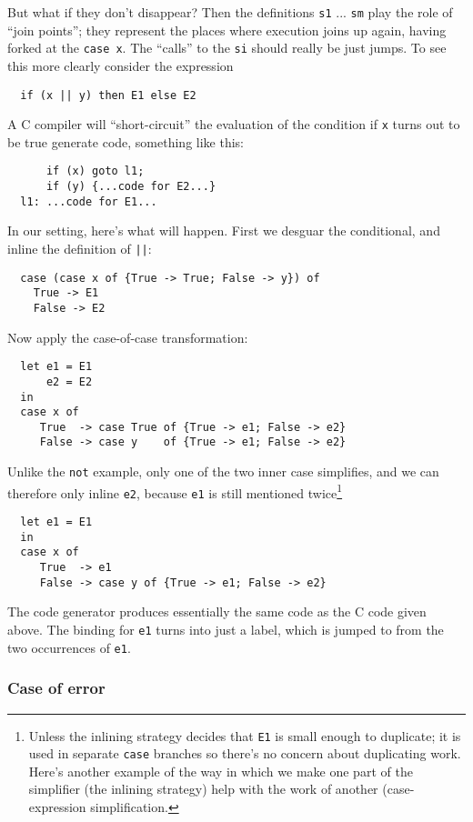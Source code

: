 \documentclass[11pt]{article}
\begin{document}
But what if they don't disappear?  Then the definitions \texttt{s1} ... \texttt{sm}
play the role of ``join points''; they represent the places where
execution joins up again, having forked at the \texttt{case x}.  The
``calls'' to the \texttt{si} should really be just jumps.  To see this more clearly
consider the expression
\begin{lstlisting}
  if (x || y) then E1 else E2
\end{lstlisting}
A C compiler will ``short-circuit'' the
evaluation of the condition if \texttt{x} turns out to be true
generate code, something like this:
\begin{lstlisting}
      if (x) goto l1;
      if (y) {...code for E2...}
  l1: ...code for E1...
\end{lstlisting}
In our setting, here's what will happen.  First we desguar the
conditional, and inline the definition of \texttt{||}:
\begin{lstlisting}
  case (case x of {True -> True; False -> y}) of
    True -> E1
    False -> E2
\end{lstlisting}
Now apply the case-of-case transformation:
\begin{lstlisting}
  let e1 = E1
      e2 = E2
  in
  case x of 
     True  -> case True of {True -> e1; False -> e2}
     False -> case y    of {True -> e1; False -> e2}
\end{lstlisting}
Unlike the \texttt{not} example, only one of the two inner case
simplifies, and we can therefore only inline \texttt{e2}, because
\texttt{e1} is still mentioned twice\footnote{Unless the
inlining strategy decides that \texttt{E1} is small enough to duplicate;
it is used in separate \texttt{case} branches so there's no concern about duplicating
work.  Here's another example of the way in which we make one part of the 
simplifier (the inlining strategy) help with the work of another (case-expression
simplification.}
\begin{lstlisting}
  let e1 = E1
  in
  case x of 
     True  -> e1
     False -> case y of {True -> e1; False -> e2}
\end{lstlisting}
The code generator produces essentially the same code as
the C code given above.  The binding for \texttt{e1} turns into 
just a label, which is jumped to from the two occurrences of \texttt{e1}.

\subsubsection{Case of error}
\end{document}
